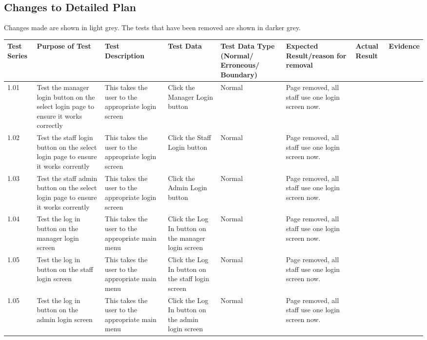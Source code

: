 \begin{landscape}
\begin{center}
\begin{longtable}{|p{1.5cm}|p{2cm}|p{2.5cm}|p{4cm}|p{2cm}|p{2cm}|p{1cm}|p{1.7cm}|}
    \end{longtable}
\end{center}


\subsection{Changes to Detailed Plan}

Changes made are shown in light grey. The tests that have been removed are shown in darker grey.

\begin{center}
    \begin{longtable}{|p{1.5cm}|p{2cm}|p{2.5cm}|p{2cm}|p{2cm}|p{2cm}|p{3cm}|p{1.7cm}|}
        \hline
        \textbf{Test Series} & \textbf{Purpose of Test} & \textbf{Test Description} & \textbf{Test Data} & \textbf{Test Data Type (Normal/ Erroneous/ Boundary)} & \textbf{Expected Result/reason for removal} & \textbf{Actual Result} & \textbf{Evidence}\\ \hline
\rowcolor{gray}1.01 & Test the manager login button on the select login page to ensure it works correctly  & This takes the user to the appropriate login screen & Click the Manager Login button & Normal & Page removed, all staff use one login screen now. & & \\ \hline
\rowcolor{gray}1.02 & Test the staff login button on the select login page to ensure it works corrently & This takes the user to the appropriate login screen & Click the Staff Login button & Normal &  Page removed, all staff use one login screen now. && \\ \hline
\rowcolor{gray}1.03 & Test the staff admin button on the select login page to ensure it works corrently & This takes the user to the appropriate login screen & Click the Admin Login button & Normal &  Page removed, all staff use one login screen now. && \\ \hline
\rowcolor{gray}1.04 & Test the log in button on the manager login screen  & This takes the user to the appropriate main menu & Click the Log In button on the manager login screen & Normal &  Page removed, all staff use one login screen now.&& \\ \hline
\rowcolor{gray}1.05 & Test the log in button on the staff login screen  & This takes the user to the appropriate main menu & Click the Log In button on the staff login screen & Normal &  Page removed, all staff use one login screen now.&& \\ \hline
\rowcolor{gray}1.05 & Test the log in button on the admin login screen  & This takes the user to the appropriate main menu & Click the Log In button on the admin login screen & Normal &  Page removed, all staff use one login screen now. && \\ \hline

\end{longtable}
\end{center}
\end{landscape}
